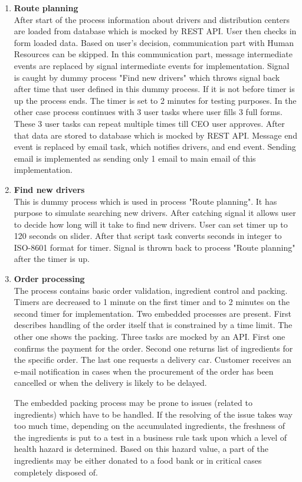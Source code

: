 \documentclass[11pt,a4paper]{article}
\begin{document}
\begin{enumerate}
    \item \textbf{Route planning}\\
    After start of the process information about drivers and distribution centers are loaded from database which is mocked by REST API. User then checks in form loaded data. Based on user's decision, communication part with Human Resources can be skipped. In this communication part, message intermediate events are replaced by signal intermediate events for implementation. Signal is caught by dummy process "Find new drivers" which throws signal back after time that user defined in this dummy process. If it is not before timer is up the process ends. The timer is set to 2 minutes for testing purposes. In the other case process continues with 3 user tasks where user fills 3 full forms. These 3 user tasks can repeat multiple times till CEO user approves. After that data are stored to database which is mocked by REST API. Message end event is replaced by email task, which notifies drivers, and end event. Sending email is implemented as sending only 1 email to main email of this implementation.
    \item \textbf{Find new drivers}\\
    This is dummy process which is used in process "Route planning". It has purpose to simulate searching new drivers. After catching signal it allows user to decide how long will it take to find new drivers. User can set timer up to 120 seconds on slider. After that script task converts seconds in integer to ISO-8601 format for timer. Signal is thrown back to process "Route planning" after the timer is up.
    \item \textbf{Order processing}\\
    The process contains basic order validation, ingredient control and packing. Timers are decreased to 1 minute on the first timer and to 2 minutes on the second timer for implementation. Two embedded processes are present. First describes handling of the order itself that is constrained by a time limit. The other one shows the packing. Three tasks are mocked by an API. First one confirms the payment for the order. Second one returns list of ingredients for the specific order. The last one requests a delivery car. Customer receives an e-mail notification in cases when the procurement of the order has been cancelled or when the delivery is likely to be delayed.
    
    The embedded packing process may be prone to issues (related to ingredients) which have to be handled. If the resolving of the issue takes way too much time, depending on the accumulated ingredients, the freshness of the ingredients is put to a test in a business rule task upon which a level of health hazard is determined. Based on this hazard value, a part of the ingredients may be either donated to a food bank or in critical cases completely disposed of. 
\end{enumerate}
\end{document}
